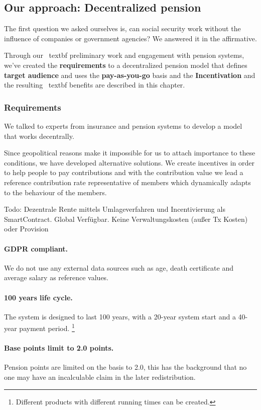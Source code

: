 \subsection{Our approach: Decentralized pension}

The first question we asked ourselves is, can social security work without the influence of companies or government agencies? We answered it in the affirmative.

Through our \ textbf {preliminary work} and engagement with pension systems, we've created the \textbf{requirements} to a decentralized pension model that defines \textbf{target audience} and uses the \textbf{pay-as-you-go} basis and the \textbf{ Incentivation} and the resulting \ textbf {benefits} are described in this chapter.

\subsubsection{Requirements}
We talked to experts from insurance and pension systems to develop a model that works decentrally.

Since geopolitical reasons make it impossible for us to attach importance to these conditions, we have developed alternative solutions.
We create incentives in order to help people to pay contributions and with the contribution value we lead a reference contribution rate representative of members which dynamically adapts to the behaviour of the members.

Todo: 
Dezentrale Rente mittels Umlageverfahren und Incentivierung als SmartContract.
Global Verfügbar. Keine Verwaltungskosten (außer Tx Kosten) oder Provision

\paragraph{GDPR\cite{gdpr} compliant.} We do not use any external data sources such as age, death certificate and average salary as reference values.

\paragraph{100 years life cycle.} The system is designed to last 100 years, with a 20-year system start and a 40-year payment period. \footnote{ Different products with different running times can be created.} 

\paragraph{Base points limit to 2.0 points.} Pension points are limited on the basis to 2.0, this has the background that no one may have an incalculable claim in the later redistribution.


